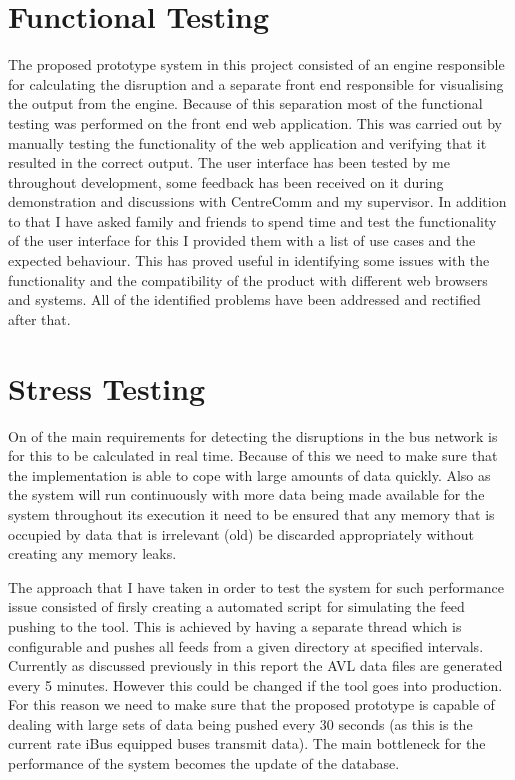 \section{Functional Testing}
The proposed prototype system in this project consisted of an engine responsible for calculating the disruption and a separate front end responsible for visualising the output from the engine. Because of this separation most of the functional testing was performed on the front end web application. This was carried out by manually testing the functionality of the web application and verifying that it resulted in the correct output. The user interface has been tested by me throughout development, some feedback has been received on it during demonstration and discussions with CentreComm and my supervisor. In addition to that I have asked family and friends to spend time and test the functionality of the user interface for this I provided them with a list of use cases and the expected behaviour. This has proved useful in identifying some issues with the functionality and the compatibility of the product with different web browsers and systems. All of the identified problems have been addressed and rectified after that.

\section{Stress Testing}
On of the main requirements for detecting the disruptions in the bus network is for this to be calculated in real time. Because of this we need to make sure that the implementation is able to cope with large amounts of data quickly. Also as the system will run continuously with more data being made available for the system throughout its execution it need to be ensured that any memory that is occupied by data that is irrelevant (old) be discarded appropriately without creating any memory leaks. 

The approach that I have taken in order to test the system for such performance issue consisted of firsly creating a automated script for simulating the feed pushing to the tool. This is achieved by having a separate thread which is configurable and pushes all feeds from a given directory at specified intervals. Currently as discussed previously in this report the AVL data files are generated every 5 minutes. However this could be changed if the tool goes into production. For this reason we need to make sure that the proposed prototype is capable of dealing with large sets of data being pushed every 30 seconds (as this is the current rate iBus equipped buses transmit data). The main bottleneck for the performance of the system becomes the update of the database.

